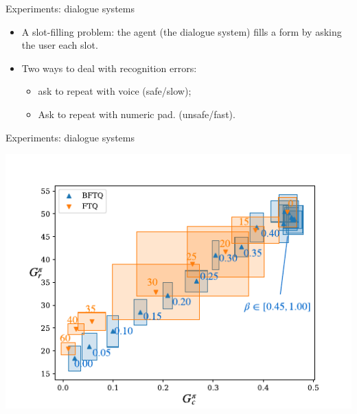 \documentclass{beamer}
\begin{document}
    \begin{frame}{Experiments: dialogue systems}
        \begin{itemize}
            \item A slot-filling problem: the agent (the dialogue system) fills a form by asking the user each slot.
            \pause\item Two ways to deal with recognition errors:
            \begin{itemize}
                \item ask to repeat with voice (safe/slow);
                \item Ask to repeat with numeric pad. (unsafe/fast).
            \end{itemize}
        \end{itemize}

    \end{frame}
    \begin{frame}{Experiments: dialogue systems}
        \begin{center}
            \includegraphics[width=\textwidth]{talk/img/slot-filling.pdf}
        \end{center}
    \end{frame}
\end{document}
